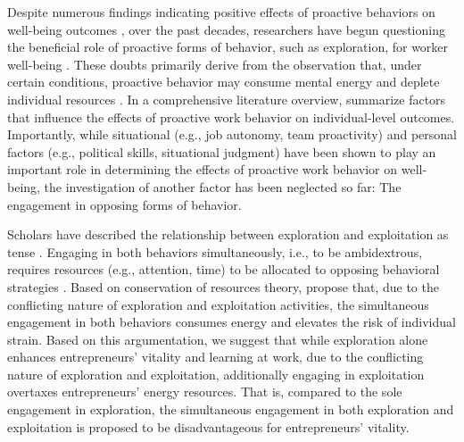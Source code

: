 \documentclass[man, 12pt, a4paper, noextraspace]{apa6}
\begin{document}
Despite numerous findings indicating positive effects of proactive behaviors on well-being outcomes \parencite[see]{Bindl.2010, Bateman1999}, over the past decades, researchers have begun questioning the beneficial role of proactive forms of behavior, such as exploration, for worker well-being \parencite[e.g.,][]{Bolino.2010, Strauss2017, Parker2019}. 
These doubts primarily derive from the observation that, under certain conditions, proactive behavior may consume mental energy \parencite{Bolino.2010} and deplete individual resources \parencite{Grant.2011}.
In a comprehensive literature overview, \textcite{Parker2019} summarize factors that influence the effects of proactive work behavior on individual-level outcomes. 
Importantly, while situational (e.g., job autonomy, team proactivity) and personal factors (e.g., political skills, situational judgment) have been shown to play an important role in determining the effects of proactive work behavior on well-being, the investigation of another factor has been neglected so far: The engagement in opposing forms of behavior. \par 

Scholars have described the relationship between exploration and exploitation as tense \parencite[e.g.,][]{Li2008, Andriopoulos2009}. 
Engaging in both behaviors simultaneously, i.e., to be ambidextrous, requires resources (e.g., attention, time) to be allocated to opposing behavioral strategies \parencite{Laureiro-Martinez2010}. 
Based on conservation of resources \parencite[COR;][]{Hobfoll.1989} theory, \textcite{Hunter2017} propose that, due to the conflicting nature of exploration and exploitation activities, the simultaneous engagement in both behaviors consumes energy and elevates the risk of individual strain.
Based on this argumentation, we suggest that while exploration alone enhances entrepreneurs' vitality and learning at work, due to the conflicting nature of exploration and exploitation, additionally engaging in exploitation overtaxes entrepreneurs' energy resources. 
That is, compared to the sole engagement in exploration, the simultaneous engagement in both exploration and exploitation is proposed to be disadvantageous for entrepreneurs' vitality. \par 
\end{document}
